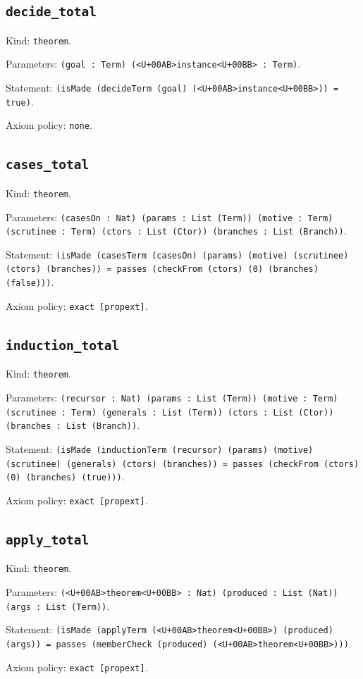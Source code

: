 \documentclass[11pt]{article}
\begin{document}
\subsection*{\texttt{decide\_total}}
\noindent Kind: \texttt{theorem}.\par
\noindent Parameters: \texttt{(goal : Term) (<U+00AB>instance<U+00BB> : Term)}.\par
\noindent Statement: \texttt{(isMade (decideTerm (goal) (<U+00AB>instance<U+00BB>)) = true)}.\par
\noindent Axiom policy: \texttt{none}.\par
\subsection*{\texttt{cases\_total}}
\noindent Kind: \texttt{theorem}.\par
\noindent Parameters: \texttt{(casesOn : Nat) (params : List (Term)) (motive : Term) (scrutinee : Term) (ctors : List (Ctor)) (branches : List (Branch))}.\par
\noindent Statement: \texttt{(isMade (casesTerm (casesOn) (params) (motive) (scrutinee) (ctors) (branches)) = passes (checkFrom (ctors) (0) (branches) (false)))}.\par
\noindent Axiom policy: \texttt{exact [propext]}.\par
\subsection*{\texttt{induction\_total}}
\noindent Kind: \texttt{theorem}.\par
\noindent Parameters: \texttt{(recursor : Nat) (params : List (Term)) (motive : Term) (scrutinee : Term) (generals : List (Term)) (ctors : List (Ctor)) (branches : List (Branch))}.\par
\noindent Statement: \texttt{(isMade (inductionTerm (recursor) (params) (motive) (scrutinee) (generals) (ctors) (branches)) = passes (checkFrom (ctors) (0) (branches) (true)))}.\par
\noindent Axiom policy: \texttt{exact [propext]}.\par
\subsection*{\texttt{apply\_total}}
\noindent Kind: \texttt{theorem}.\par
\noindent Parameters: \texttt{(<U+00AB>theorem<U+00BB> : Nat) (produced : List (Nat)) (args : List (Term))}.\par
\noindent Statement: \texttt{(isMade (applyTerm (<U+00AB>theorem<U+00BB>) (produced) (args)) = passes (memberCheck (produced) (<U+00AB>theorem<U+00BB>)))}.\par
\noindent Axiom policy: \texttt{exact [propext]}.\par
\end{document}
